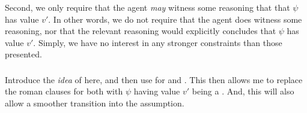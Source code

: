 \begin{note}
  Second, we only require that the agent \emph{may} witness some reasoning that \emph{} that \(\psi\) has value \(v'\).
  In other words, we do not require that the agent does witness some reasoning, nor that the relevant reasoning would explicitly concludes that \(\psi\) has value \(v'\).
  Simply, we have no interest in any stronger constraints than those presented.
\end{note}

\subsubsection{}
\label{sec:requ-idea}

\begin{note}
  \color{red}
  Introduce the \emph{idea} of  here, and then use for \ideaCSB{} and \ideaCSC{}.
  This then allows me to replace the roman clauses for both with \(\psi\) having value \(v'\) being a \requ{}.
  And, this will also allow a smoother transition into the assumption.
\end{note}

